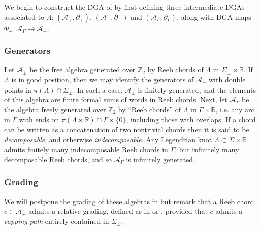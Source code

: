 \documentclass[11pt]{amsart}
\theoremstyle{mystyle}
\newcommand{\R}{\mathbb{R}}
\newcommand{\Z}{\mathbb{Z}}
\newcommand{\<}{\langle}
\renewcommand{\>}{\rangle}
\begin{document}
We begin to construct the DGA of  by first defining three intermediate DGAs associated to $\Lambda$: $(\mathcal{A}_+,\partial_+)$, $(\mathcal{A}_-,\partial_-)$ and $(\mathcal{A}_\Gamma,\partial_\Gamma)$, along with DGA maps $\Phi_\pm:\mathcal{A}_\Gamma\to \mathcal{A}_\pm$.

\subsubsection{Generators}

Let $\mathcal{A}_\pm$ be the free algebra generated over $\Z_2$ by Reeb chords of $\Lambda$ in $\Sigma_\pm\times \R$. If $\Lambda$ is in good position, then we may identify the generators of $\mathcal{A}_\pm$ with double points in $\pi(\Lambda)\cap \Sigma_\pm$. In such a case, $\mathcal{A}_\pm$ is finitely generated, and the elements of this algebra are finite formal sums of words in Reeb chords. Next, let $\mathcal{A}_\Gamma$ be the algebra freely generated over $\Z_2$ by ``Reeb chords'' of $\Lambda$ in $\Gamma\times \R$, i.e. any arc in $\Gamma$ with ends on $\pi(\Lambda\times \R)\cap \Gamma\times \{0\}$, including those with overlaps. If a chord can be written as a concatenation of two nontrivial chords then it is said to be \textit{decomposable}, and otherwise \textit{indecomposable}. Any Legendrian knot $\Lambda\subset \Sigma\times \R$ admits finitely many indecomposable Reeb chords in $\Gamma$, but infinitely many decomposable Reeb chords, and so $\mathcal{A}_\Gamma$ is infinitely generated.

\subsubsection{Grading}

 We will postpone the grading of these algebras in  but remark that a Reeb chord $c\in \mathcal{A}_\pm$ admits a relative grading, defined as in \cite[Sec.~7.2]{chekanov2002dga} or \cite{ekholm2007PxR}, provided that $c$ admits a \textit{capping path} entirely contained in $\Sigma_\pm$. %
\end{document}
